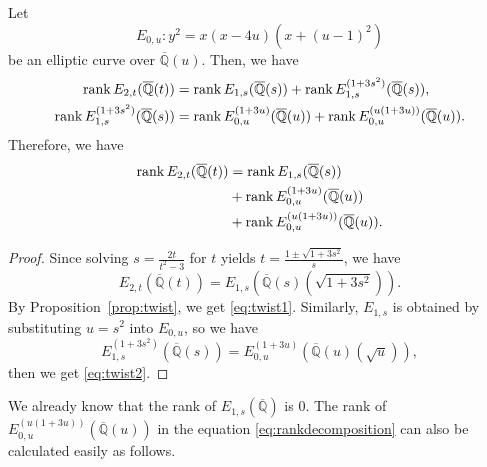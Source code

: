 \documentclass[main]{subfiles}
\begin{document}
\begin{thm}
    Let
    \begin{equation*}
        E_{0,u}: y^{2} = x(x - 4u)(x + (u - 1)^{2})
    \end{equation*}
    be an elliptic curve over $\overline{\mathbb{Q}}(u)$.
    Then, we have
    \begin{align}
        \operatorname{rank} E_{2,t}(\overline{\mathbb{Q}}(t))                & = \operatorname{rank} E_{1,s}(\overline{\mathbb{Q}}(s)) + \operatorname{rank} E_{1,s}^{(1 + 3s^{2})}(\overline{\mathbb{Q}}(s)), \label{eq:twist1}           \\
        \operatorname{rank} E_{1,s}^{(1 + 3s^{2})}(\overline{\mathbb{Q}}(s)) & = \operatorname{rank} E_{0,u}^{(1 + 3u)}(\overline{\mathbb{Q}}(u)) + \operatorname{rank} E_{0,u}^{(u(1 + 3u))}(\overline{\mathbb{Q}}(u)). \label{eq:twist2}
    \end{align}
    Therefore, we have
    \begin{equation}
        \label{eq:rankdecomposition}
        \begin{split}
            \operatorname{rank} E_{2,t}(\overline{\mathbb{Q}}(t)) & = \operatorname{rank} E_{1,s}(\overline{\mathbb{Q}}(s))                \\
                                                    & + \operatorname{rank} E_{0,u}^{(1 + 3u)}(\overline{\mathbb{Q}}(u))     \\
                                                    & + \operatorname{rank} E_{0,u}^{(u(1 + 3u))}(\overline{\mathbb{Q}}(u)).
        \end{split}
    \end{equation}
\end{thm}
\begin{proof}
    Since solving $s = \frac{2t}{t^{2} - 3}$ for $t$ yields $t = \frac{1 \pm \sqrt{1 + 3s^{2}}}{s}$, we have
    \begin{equation*}
        E_{2,t}(\overline{\mathbb{Q}}(t)) = E_{1,s}(\overline{\mathbb{Q}}(s)(\sqrt{1 + 3s^{2}})).
    \end{equation*}
    By Proposition~\ref{prop:twist}, we get \eqref{eq:twist1}.
    Similarly, $E_{1,s}$ is obtained by substituting $u = s^{2}$ into $E_{0,u}$, so we have
    \begin{equation*}
        E_{1,s}^{(1 + 3s^{2})}(\overline{\mathbb{Q}}(s)) = E_{0,u}^{(1 + 3u)}(\overline{\mathbb{Q}}(u)(\sqrt{u})),
    \end{equation*}
    then we get \eqref{eq:twist2}.
\end{proof}

We already know that the rank of $E_{1,s}(\overline{\mathbb{Q}})$ is $0$.
The rank of $E_{0,u}^{(u(1 + 3u))}(\overline{\mathbb{Q}}(u))$ in the equation \eqref{eq:rankdecomposition} can also be calculated easily as follows.
\end{document}
